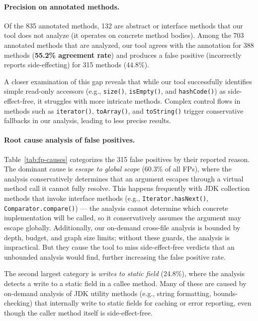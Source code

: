 \paragraph{Precision on annotated methods.}
Of the 835 annotated methods, 132 are abstract or interface methods that our tool does not analyze (it operates on concrete method bodies).
Among the 703 annotated methods that are analyzed, our tool agrees with the annotation for 388 methods (\textbf{55.2\% agreement rate}) and produces a false positive (incorrectly reports side-effecting) for 315 methods (44.8\%).


A closer examination of this gap reveals that while our tool successfully identifies simple read-only accessors (e.g., \texttt{size()}, \texttt{isEmpty()}, and \texttt{hashCode()}) as side-effect-free, it struggles with more intricate methods. Complex control flows in methods such as \texttt{iterator()}, \texttt{toArray()}, and \texttt{toString()} trigger conservative fallbacks in our analysis, leading to less precise results.


\paragraph{Root cause analysis of false positives.}
Table~\ref{tab:fp-causes} categorizes the 315 false positives by their reported reason.
The dominant cause is \emph{escape to global scope} (60.3\% of all FPs), where the analysis conservatively determines that an argument escapes through a virtual method call it cannot fully resolve.
This happens frequently with JDK collection methods that invoke interface methods (e.g., \texttt{Iterator.hasNext()}, \texttt{Comparator.compare()}) --- the analysis cannot determine which concrete implementation will be called, so it conservatively assumes the argument may escape globally. Additionally, our on-demand cross-file analysis is bounded by depth, budget, and graph size limits; without these guards, the analysis is impractical. But they cause the tool to miss side-effect-free verdicts that an unbounded analysis would find, further increasing the false positive rate. 


The second largest category is \emph{writes to static field} (24.8\%), where the analysis detects a write to a static field in a callee method.
Many of these are caused by on-demand analysis of JDK utility methods (e.g., string formatting, bounds-checking) that internally write to static fields for caching or error reporting, even though the caller method itself is side-effect-free.

